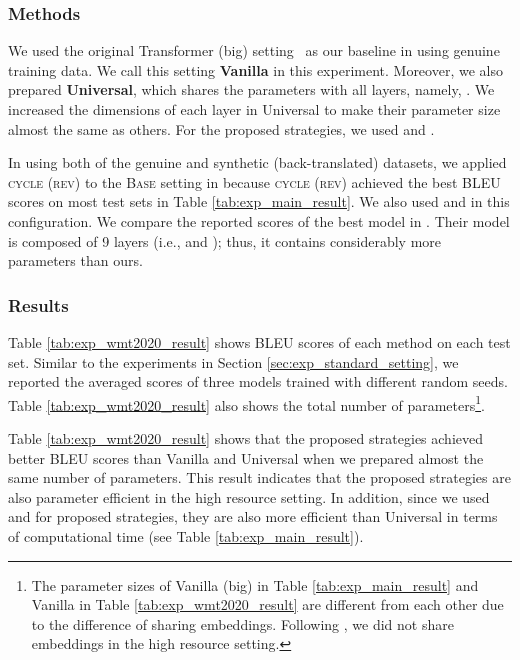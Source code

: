 \documentclass[11pt]{article}
\begin{document}
\subsubsection{Methods}
We used the original Transformer (big) setting~\cite{NIPS2017_7181} as our baseline in using genuine training data.
We call this setting \textbf{Vanilla} in this experiment.
Moreover, we also prepared \textbf{Universal}, which shares the parameters with all layers, namely, .
We increased the dimensions of each layer in Universal to make their parameter size almost the same as others.
For the proposed strategies, we used  and .

In using both of the genuine and synthetic (back-translated) datasets, we applied \textsc{cycle (rev)} to the \textsc{Base} setting in \cite{kiyono-etal-2020-tohoku} because \textsc{cycle (rev)} achieved the best BLEU scores on most test sets in Table \ref{tab:exp_main_result}.
We also used  and  in this configuration.
We compare the reported scores of the best model in \cite{kiyono-etal-2020-tohoku}.
Their model is composed of 9 layers (i.e.,  and ); thus, it contains considerably more parameters than ours.


\subsubsection{Results}
Table \ref{tab:exp_wmt2020_result} shows BLEU scores of each method on each test set.
Similar to the experiments in Section \ref{sec:exp_standard_setting}, we reported the averaged scores of three models trained with different random seeds.
Table \ref{tab:exp_wmt2020_result} also shows the total number of parameters\footnote{The parameter sizes of Vanilla (big) in Table \ref{tab:exp_main_result} and Vanilla in Table \ref{tab:exp_wmt2020_result} are different from each other due to the difference of sharing embeddings. Following \cite{kiyono-etal-2020-tohoku}, we did not share embeddings in the high resource setting.}.

Table \ref{tab:exp_wmt2020_result} shows that the proposed strategies achieved better BLEU scores than Vanilla and Universal when we prepared almost the same number of parameters.
This result indicates that the proposed strategies are also parameter efficient in the high resource setting.
In addition, since we used  and  for proposed strategies, they are also more efficient than Universal in terms of computational time (see Table \ref{tab:exp_main_result}).
\end{document}
